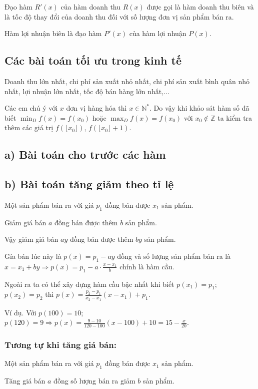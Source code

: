 	Đạo hàm $R'(x)$ của hàm doanh thu $R(x)$ được gọi là hàm doanh thu biên và là tốc độ thay đổi của doanh thu đối với số lượng đơn vị sản phẩm bán ra.

	Hàm lợi nhuận biên là đạo hàm $P'(x)$ của hàm lợi nhuận $P(x)$.

	\subsection*{Các bài toán tối ưu trong kinh tế}
	Doanh thu lớn nhất, chi phí sản xuất nhỏ nhất, chi phí sản xuất bình quân nhỏ nhất, lợi nhuận lớn nhất, tốc độ bán hàng lớn nhất,...

	Các em chú ý với $x$ đơn vị hàng hóa thì $x \in \mathbb{N}^*$. Do vậy khi khảo sát hàm số đã biết $\min_{D} f(x) = f(x_0)$ hoặc $\max_{D} f(x) = f(x_0)$ với $x_0 \notin \mathbb{Z}$ ta kiểm tra thêm các giá trị $f(\lfloor x_0 \rfloor)$, $f(\lfloor x_0 \rfloor + 1)$.

	\subsection*{a) Bài toán cho trước các hàm}

	\subsection*{b) Bài toán tăng giảm theo tỉ lệ}
	Một sản phẩm bán ra với giá $p_1$ đồng bán được $x_1$ sản phẩm.

	Giảm giá bán $a$ đồng bán được thêm $b$ sản phẩm.

	Vậy giảm giá bán $ay$ đồng bán được thêm $by$ sản phẩm.

	Gía bán lúc này là $p(x) = p_1 - ay$ đồng và số lượng sản phẩm bán ra là $x = x_1 + by \Rightarrow p(x) = p_1 - a \cdot \frac{x-x_1}{b}$ chính là hàm cầu.

	Ngoài ra ta có thể xây dựng hàm cầu bậc nhất khi biết $p(x_1) = p_1$; $p(x_2) = p_2$ thì $p(x) = \frac{p_2 - p_1}{x_2 - x_1}(x-x_1) + p_1$.

	Ví dụ. Với $p(100) = 10$; $p(120) = 9 \Rightarrow p(x) = \frac{9 - 10}{120 - 100}(x - 100) + 10 = 15 - \frac{x}{20}$.

		\subsubsection*{Tương tự khi tăng giá bán:}
		Một sản phẩm bán ra với giá $p_1$ đồng bán được $x_1$ sản phẩm.

		Tăng giá bán $a$ đồng số lượng bán ra giảm $b$ sản phẩm.

